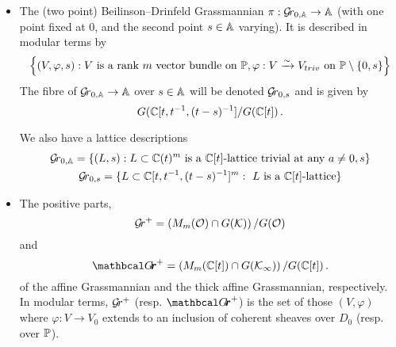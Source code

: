 \documentclass[draft]{article}
\begin{document}
\begin{itemize}
    \item The (two point) Beilinson--Drinfeld Grassmannian $\pi : \Grbd\to \AA$ (with one point fixed at 0, and the second point $s\in\AA$ varying).
    It is described in modular terms by 
    $$
        \left\{ 
            (V,\varphi,s) : V\text{ is a rank $m$ vector bundle on }\PP, \varphi : V \xrightarrow{\sim} \Vtriv \text{ on } \PP \setminus \{0, s\}  
        \right\} 
    $$%
    The fibre of $\Grbd \to \AA$ over $ s \in \AA $ will be denoted $ \Gr_{0,s} $ and is given by
    $$ 
    G(\CC[t, t^{-1}, (t-s)^{-1}]/G(\CC[t])\,. %
    $$
    
    We also have a lattice descriptions 
    \begin{gather*}
    \Grbd = 
    \{ (L,s) :
    \text{$L \subset  \CC(t)^m$ is a $\CC[t]$-lattice trivial at any $ a \ne 0, s$} \} \\
     \Gr_{0,s} = 
    \{ L \subset  \CC[t,t^{-1},(t-s)^{-1}]^m : \text{ $L$ is a $\CC[t]$-lattice} \}
    \end{gather*}%
    \item The positive parts, 
    \[
        \Gr^+ = \left(M_m(\cO) \cap G(\cK)\right) / G(\cO)
    \]
    and
    \[
        {\Grth}^+ = \left(M_m(\CC[t]) \cap G(\Kinf)\right) / G(\CC[t])\,. 
    \]
    of the affine Grassmannian and the thick affine Grassmannian, respectively. %
    In modular terms, $\Gr^+$ (resp. ${\Grth}^+$) is the set of those $ (V, \varphi)$ where $ \varphi : V \rightarrow V_0 $ extends to an inclusion of coherent sheaves over $ D_0 $ (resp. over $ \PP$). 
    

\end{itemize}
\end{document}
